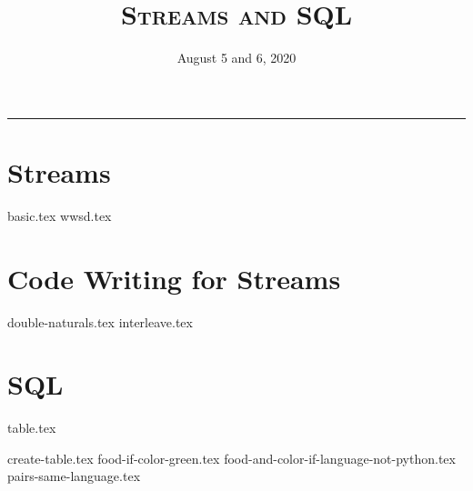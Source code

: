 \documentclass{exam}
\title{\textsc{Streams and SQL}}
\date{August 5 and 6, 2020}
\begin{document}
\maketitle
\rule{\textwidth}{0.15em}
\fontsize{12}{15}\selectfont

\section{Streams}
\begin{questions}
{basic.tex}
\newpage
{wwsd.tex}
\end{questions}
\section{Code Writing for Streams}
\begin{questions}
{double-naturals.tex}
{interleave.tex}
\end{questions}

\newpage
\section{SQL}
{table.tex}

\begin{questions}
{create-table.tex}
\newpage
{food-if-color-green.tex}
{food-and-color-if-language-not-python.tex}
{pairs-same-language.tex}
\end{questions}




\end{document}
